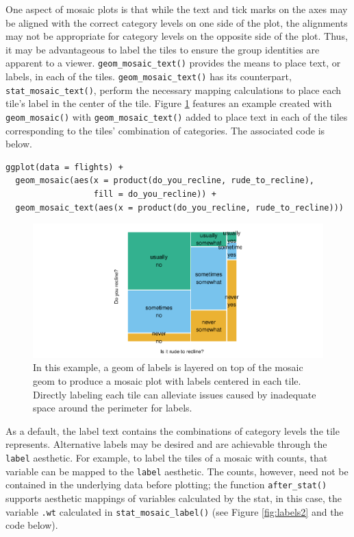 One aspect of mosaic plots is that while the text and tick marks on the axes may be aligned with the correct category levels on one side of the plot, the alignments may not be appropriate for category levels on the opposite side of the plot. Thus, it may be advantageous to label the tiles to ensure the group identities are apparent to a viewer. \texttt{geom\_mosaic\_text()} provides the means to place text, or labels, in each of the tiles. \texttt{geom\_mosaic\_text()} has its counterpart, \texttt{stat\_mosaic\_text()}, perform the necessary mapping calculations to place each tile's label in the center of the tile. Figure \ref{fig:labels} features an example created with \texttt{geom\_mosaic()} with \texttt{geom\_mosaic\_text()} added to place text in each of the tiles corresponding to the tiles' combination of categories. The associated code is below.

\begin{verbatim}
ggplot(data = flights) +
  geom_mosaic(aes(x = product(do_you_recline, rude_to_recline), 
                  fill = do_you_recline)) +
  geom_mosaic_text(aes(x = product(do_you_recline, rude_to_recline)))
\end{verbatim}

\begin{figure}[h]

{\centering \includegraphics[width=1\linewidth]{RJ-2023-013_files/figure-latex/labels-1} 

}

\caption{In this example, a geom of labels is layered on top of the mosaic geom to produce a mosaic plot with labels centered in each tile. Directly labeling each tile can alleviate issues caused by inadequate space around the perimeter for labels.}\label{fig:labels}
\end{figure}

As a default, the label text contains the combinations of category levels the tile represents. Alternative labels may be desired and are achievable through the \texttt{label} aesthetic. For example, to label the tiles of a mosaic with counts, that variable can be mapped to the \texttt{label} aesthetic. The counts, however, need not be contained in the underlying data before plotting; the function \texttt{after\_stat()} supports aesthetic mappings of variables calculated by the stat, in this case, the variable \texttt{.wt} calculated in \texttt{stat\_mosaic\_label()} (see Figure \ref{fig:labels2} and the code below).

